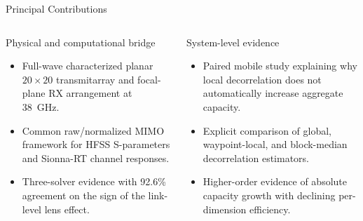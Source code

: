 \begin{frame}[t]{Principal Contributions}
\scriptsize
\begin{columns}[T,onlytextwidth]
  \begin{block}{Physical and computational bridge}
    \raggedright
    \begin{itemize}
      \setlength{\itemsep}{0.30em}
      \item Full-wave characterized planar $20\times20$ transmitarray and
            focal-plane RX arrangement at 38~GHz.
      \item Common raw/normalized MIMO framework for HFSS S-parameters and
            Sionna-RT channel responses.
      \item Three-solver evidence with 92.6\% agreement on the sign of the
            link-level lens effect.
    \end{itemize}
  \end{block}

  \begin{block}{System-level evidence}
    \raggedright
    \begin{itemize}
      \setlength{\itemsep}{0.30em}
      \item Paired mobile study explaining why local decorrelation does not
            automatically increase aggregate capacity.
      \item Explicit comparison of global, waypoint-local, and block-median
            decorrelation estimators.
      \item Higher-order evidence of absolute capacity growth with declining
            per-dimension efficiency.
    \end{itemize}
  \end{block}
\end{columns}
\end{frame}


